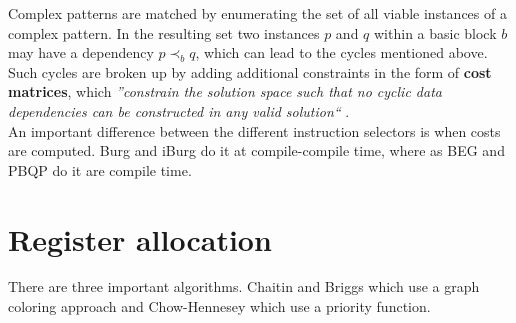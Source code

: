 \documentclass[a4paper,10pt]{article}
\begin{document}
Complex patterns are matched by enumerating the set of all viable instances of a complex pattern. In the resulting set two instances $p$ 
and $q$ within a basic block $b$ may have a dependency $p \prec_b q$, which can lead to the cycles mentioned above. Such cycles are broken 
up by adding additional constraints in the form of \textbf{cost matrices}, which \textit{''constrain the solution space such that no 
cyclic data dependencies can be constructed in any valid solution``} \cite{pbqp-instruction-selection}.\\

An important difference between the different instruction selectors is when costs are computed. Burg and iBurg do it at compile-compile 
time, where as BEG and PBQP do it are compile time.

\section{Register allocation}
There are three important algorithms. Chaitin and Briggs which use a graph coloring approach and Chow-Hennesey which use a priority 
function.
\end{document}
